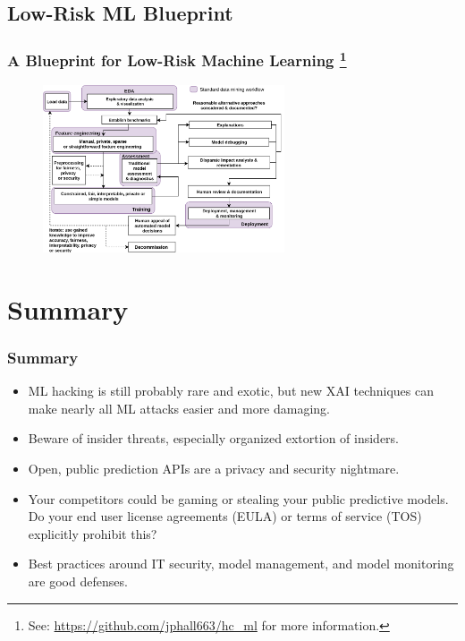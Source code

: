 \documentclass[11pt,
               aspectratio=169,
               hyperref={colorlinks}
               ]{beamer}
\begin{document}
		\subsection{Low-Risk ML Blueprint}

		\begin{frame}
		
			\frametitle{A Blueprint for Low-Risk Machine Learning \footnote{See: \url{ https://github.com/jphall663/hc_ml} for more information.} }		
			
			\begin{figure}[htb]
				\begin{center}
					\includegraphics[height=140pt]{img/blueprint.png}
				\end{center}
			\end{figure}	

		\end{frame}

	\section{Summary}

		\begin{frame}
		
			\frametitle{Summary}		
			
			\begin{itemize}
				\item ML hacking is still probably rare and exotic, but new XAI techniques can make nearly all ML attacks easier and more damaging.
				\item Beware of insider threats, especially organized extortion of insiders. 
				\item Open, public prediction APIs are a privacy and security nightmare. 
				\item Your competitors could be gaming or stealing your public predictive models. Do your end user license agreements (EULA) or terms of service (TOS) explicitly prohibit this?
				\item Best practices around IT security, model management, and model monitoring are good defenses.
			\end{itemize}
		
		\end{frame}
\end{document}
